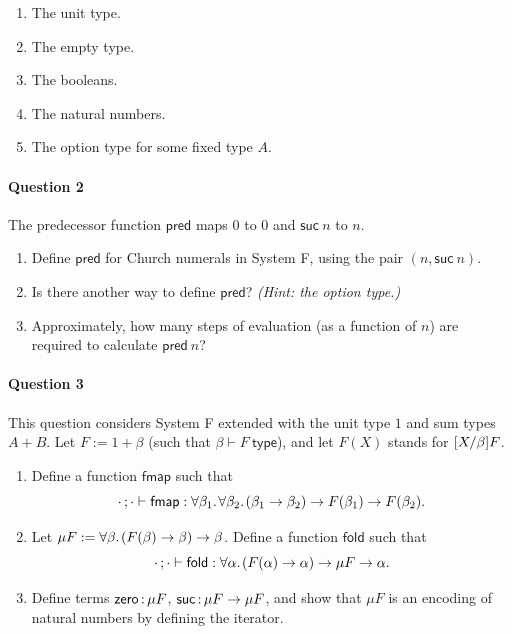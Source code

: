 \documentclass[11pt,a4paper,twoside]{article}
\begin{document}
\begin{enumerate}[label=(\alph*)]
  \item The unit type.
  \item The empty type.
  \item The booleans.
  \item The natural numbers.
  \item The option type for some fixed type $A$.
\end{enumerate}

\paragraph{Question 2} The predecessor function $\mathsf{pred}$ maps
$0$ to $0$ and $\mathsf{suc}\ n$ to $n$.

\begin{enumerate}[label=(\alph*)]
  \item Define $\mathsf{pred}$ for Church numerals in System F, using
    the pair $(n, \mathsf{suc}\ n)$.

  \item Is there another way to define $\mathsf{pred}$? \emph{(Hint:
    the option type.)}

  \item Approximately, how many steps of evaluation (as a function of
    $n$) are required to calculate $\mathsf{pred}\ n$?
\end{enumerate}

\paragraph{Question 3} This question considers System F extended with
the unit type $1$ and sum types $A + B$.
Let $F := 1 + \beta$ (such that $\beta \vdash F\ \mathsf{type}$),
and let $F(X)$ stands for $[X / \beta] F$.

\begin{enumerate}[label=(\alph*)]
  \item Define a function $\mathsf{fmap}$ such that
    \[ \cdot\, ; \cdot \vdash \mathsf{fmap} :
      \forall \beta_1 .\;\! \forall \beta_2 .\;\! (\beta_1 \to \beta_2) \to
    F(\beta_1) \to F(\beta_2). \]

  \item Let $\mu F := \forall \beta .\;\! (F(\beta) \to \beta) \to \beta$.
    Define a function $\mathsf{fold}$ such that
    \[ \cdot\, ; \cdot \vdash \mathsf{fold} : \forall \alpha .\;\! (F(\alpha) \to
      \alpha) \to \mu F \to \alpha.
    \]

  \item Define terms $\mathsf{zero} \,{:}\, \mu F$,
    $\mathsf{suc} \,{:}\, \mu F \to \mu F$,
    and show that $\mu F$ is an encoding of natural numbers
    by defining the iterator.
\end{enumerate}
\end{document}
